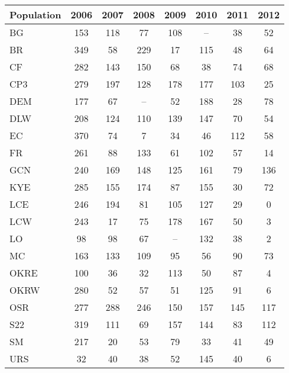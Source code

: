\documentclass[12pt, oneside, titlepage]{article}   	%
\begin{document}
 \label{tab:sigma} 
\begin{table}[ht]
\centering
\begin{tabular}{lccccccc}
  \hline
Population & 2006 & 2007 & 2008 & 2009 & 2010 & 2011 & 2012 \\ 
  \hline
BG & 153 & 118 &  77 & 108 & -- &  38 &  52 \\ 
  BR & 349 &  58 & 229 &  17 & 115 &  48 &  64 \\ 
  CF & 282 & 143 & 150 &  68 &  38 &  74 &  68 \\ 
  CP3 & 279 & 197 & 128 & 178 & 177 & 103 &  25 \\ 
  DEM & 177 &  67 & -- &  52 & 188 &  28 &  78 \\ 
  DLW & 208 & 124 & 110 & 139 & 147 &  70 &  54 \\ 
  EC & 370 &  74 &   7 &  34 &  46 & 112 &  58 \\ 
  FR & 261 &  88 & 133 &  61 & 102 &  57 &  14 \\ 
  GCN & 240 & 169 & 148 & 125 & 161 &  79 & 136 \\ 
  KYE & 285 & 155 & 174 &  87 & 155 &  30 &  72 \\ 
  LCE & 246 & 194 &  81 & 105 & 127 &  29 &   0 \\ 
  LCW & 243 &  17 &  75 & 178 & 167 &  50 &   3 \\ 
  LO &  98 &  98 &  67 & -- & 132 &  38 &   2 \\ 
  MC & 163 & 133 & 109 &  95 &  56 &  90 &  73 \\ 
  OKRE & 100 &  36 &  32 & 113 &  50 &  87 &   4 \\ 
  OKRW & 280 &  52 &  57 &  51 & 125 &  91 &   6 \\ 
  OSR & 277 & 288 & 246 & 150 & 157 & 145 & 117 \\ 
  S22 & 319 & 111 &  69 & 157 & 144 &  83 & 112 \\ 
  SM & 217 &  20 &  53 &  79 &  33 &  41 &  49 \\ 
  URS &  32 &  40 &  38 &  52 & 145 &  40 &   6 \\ 
   \hline
\end{tabular}
\end{table}

  \newpage
 
 
\end{document}
